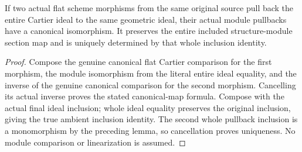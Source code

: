 \begin{lemma}
\label{lem:cartier-invariant-module-iso}
\leanok
{}
If two actual flat scheme morphisms from the same original source pull
back the entire Cartier ideal to the same geometric ideal, their actual
module pullbacks have a canonical isomorphism. It preserves the entire
included structure-module section map and is uniquely determined by that
whole inclusion identity.
\end{lemma}
\begin{proof}
Compose the genuine canonical flat Cartier comparison for the first
morphism, the module isomorphism from the literal entire ideal equality,
and the inverse of the genuine canonical comparison for the second
morphism. Cancelling its actual inverse proves the stated canonical-map
formula. Compose with the actual final ideal inclusion; whole ideal
equality preserves the original inclusion, giving the true ambient
inclusion identity. The second whole pullback inclusion is a monomorphism
by the preceding lemma, so cancellation proves uniqueness. No module
comparison or linearization is assumed.
\end{proof}

